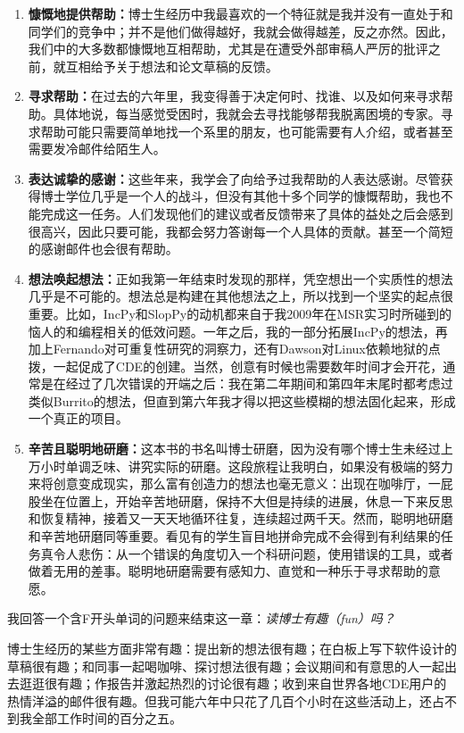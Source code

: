 \documentclass[letter,12pt]{book}
\newcommand{\bookname}{博士研磨}
\begin{document}
\begin{CJK}{UTF8}{gbsn}
\begin{enumerate}
  \item \textbf{慷慨地提供帮助：}博士生经历中我最喜欢的一个特征就是我并没有一直处于和同学们的竞争中；并不是他们做得越好，我就会做得越差，反之亦然。因此，我们中的大多数都慷慨地互相帮助，尤其是在遭受外部审稿人严厉的批评之前，就互相给予关于想法和论文草稿的反馈。
  \item \textbf{寻求帮助：}在过去的六年里，我变得善于决定何时、找谁、以及如何来寻求帮助。具体地说，每当感觉受困时，我就会去寻找能够帮我脱离困境的专家。寻求帮助可能只需要简单地找一个系里的朋友，也可能需要有人介绍，或者甚至需要发冷邮件给陌生人。
  \item \textbf{表达诚挚的感谢：}这些年来，我学会了向给予过我帮助的人表达感谢。尽管获得博士学位几乎是一个人的战斗，但没有其他十多个同学的慷慨帮助，我也不能完成这一任务。人们发现他们的建议或者反馈带来了具体的益处之后会感到很高兴，因此只要可能，我都会努力答谢每一个人具体的贡献。甚至一个简短的感谢邮件也会很有帮助。
  \item \textbf{想法唤起想法：}正如我第一年结束时发现的那样，凭空想出一个实质性的想法几乎是不可能的。想法总是构建在其他想法之上，所以找到一个坚实的起点很重要。比如，IncPy和SlopPy的动机都来自于我2009年在MSR实习时所碰到的恼人的和编程相关的低效问题。一年之后，我的一部分拓展IncPy的想法，再加上Fernando对可重复性研究的洞察力，还有Dawson对Linux依赖地狱的点拨，一起促成了CDE的创建。当然，创意有时候也需要数年时间才会开花，通常是在经过了几次错误的开端之后：我在第二年期间和第四年末尾时都考虑过类似Burrito的想法，但直到第六年我才得以把这些模糊的想法固化起来，形成一个真正的项目。
  \item \textbf{辛苦且聪明地研磨：}这本书的书名叫\bookname，因为没有哪个博士生未经过上万小时单调乏味、讲究实际的研磨。这段旅程让我明白，如果没有极端的努力来将创意变成现实，那么富有创造力的想法也毫无意义：出现在咖啡厅，一屁股坐在位置上，开始辛苦地研磨，保持不大但是持续的进展，休息一下来反思和恢复精神，接着又一天天地循环往复，连续超过两千天。然而，聪明地研磨和辛苦地研磨同等重要。看见有的学生盲目地拼命完成不会得到有利结果的任务真令人悲伤：从一个错误的角度切入一个科研问题，使用错误的工具，或者做着无用的差事。聪明地研磨需要有感知力、直觉和一种乐于寻求帮助的意愿。
\end{enumerate}

\breakline

我回答一个含F开头单词的问题来结束这一章：\emph{读博士有趣（fun）吗？}

博士生经历的某些方面非常有趣：提出新的想法很有趣；在白板上写下软件设计的草稿很有趣；和同事一起喝咖啡、探讨想法很有趣；会议期间和有意思的人一起出去逛逛很有趣；作报告并激起热烈的讨论很有趣；收到来自世界各地CDE用户的热情洋溢的邮件很有趣。但我可能六年中只花了几百个小时在这些活动上，还占不到我全部工作时间的百分之五。


\end{CJK}
\end{document}
